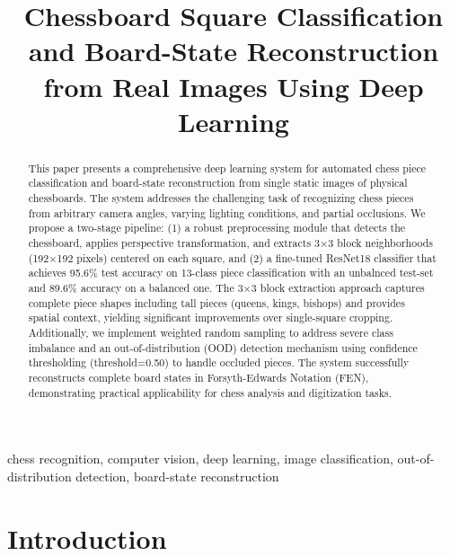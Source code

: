 \documentclass[conference]{IEEEtran}
\begin{document}
\title{Chessboard Square Classification and Board-State Reconstruction from Real Images Using Deep Learning}

\author{
}

\maketitle

\pagestyle{plain}
\thispagestyle{plain}

\begin{abstract}
This paper presents a comprehensive deep learning system for automated chess piece classification and board-state reconstruction from single static images of physical chessboards. The system addresses the challenging task of recognizing chess pieces from arbitrary camera angles, varying lighting conditions, and partial occlusions. We propose a two-stage pipeline: (1) a robust preprocessing module that detects the chessboard, applies perspective transformation, and extracts 3×3 block neighborhoods (192×192 pixels) centered on each square, and (2) a fine-tuned ResNet18 classifier that achieves 95.6\% test accuracy on 13-class piece classification with an unbalnced test-set and 89.6\% accuracy on a balanced one. The 3×3 block extraction approach captures complete piece shapes including tall pieces (queens, kings, bishops) and provides spatial context, yielding significant improvements over single-square cropping. Additionally, we implement weighted random sampling to address severe class imbalance and an out-of-distribution (OOD) detection mechanism using confidence thresholding (threshold=0.50) to handle occluded pieces. The system successfully reconstructs complete board states in Forsyth-Edwards Notation (FEN), demonstrating practical applicability for chess analysis and digitization tasks.
\end{abstract}

\begin{IEEEkeywords}
chess recognition, computer vision, deep learning, image classification, out-of-distribution detection, board-state reconstruction
\end{IEEEkeywords}

\section{Introduction}
\end{document}
